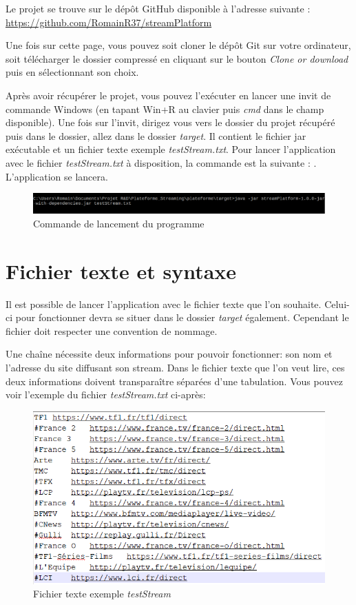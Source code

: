 \documentclass{polytech/polytech}
\begin{document}
Le projet se trouve sur le dépôt GitHub disponible à l'adresse suivante : \url{https://github.com/RomainR37/streamPlatform}

Une fois sur cette page, vous pouvez soit cloner le dépôt Git sur votre ordinateur, soit télécharger le dossier compressé en cliquant sur le bouton \textit{Clone or download} puis en sélectionnant son choix.

Après avoir récupérer le projet, vous pouvez l'exécuter en lancer une invit de commande Windows (en tapant Win+R au clavier puis \textit{cmd} dans le champ disponible). Une fois sur l'invit, dirigez vous vers le dossier du projet récupéré puis dans le dossier, allez dans le dossier \textit{target}. Il contient le fichier jar exécutable et un fichier texte exemple \textit{testStream.txt}. Pour lancer l'application avec le fichier \textit{testStream.txt} à disposition, la commande est la suivante : . L'application se lancera.

\begin{figure}
	\includegraphics[scale=0.6]{images/cmdLancement.png}
	\caption{Commande de lancement du programme}
\end{figure}


\section{Fichier texte et syntaxe}

Il est possible de lancer l'application avec le fichier texte que l'on souhaite. Celui-ci pour fonctionner devra se situer dans le dossier \textit{target} également. Cependant le fichier doit respecter une convention de nommage. 


Une chaîne nécessite deux informations pour pouvoir fonctionner: son nom et l'adresse du site diffusant son stream. Dans le fichier texte que l'on veut lire, ces deux informations doivent transparaître séparées d'une tabulation. Vous pouvez voir l'exemple du fichier \textit{testStream.txt} ci-après:

\begin{figure}
	\includegraphics[scale=0.7]{images/textFile.png}
	\caption{Fichier texte exemple \textit{testStream}}
	\label{fig:fichier_texte}
\end{figure}
\end{document}
